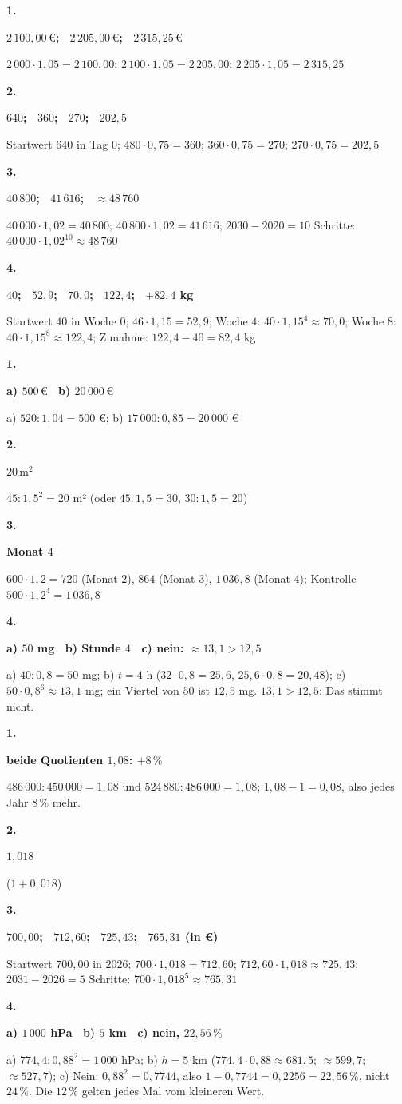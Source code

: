 \documentclass[11pt]{article}
\newcommand{\lsg}[3]{\par\noindent\begin{minipage}[t]{9mm}\textbf{#1}\end{minipage}%
  \begin{minipage}[t]{52mm}\raggedright\bfseries\boldmath #2\end{minipage}\hspace{3mm}%
  \begin{minipage}[t]{\dimexpr\linewidth-64mm\relax}\raggedright\small #3\end{minipage}\par\vspace{4pt}}
\newlength{\kr}
\begin{document}
\lsg{1.}{$2\,100{,}00\,€$; \ $2\,205{,}00\,€$; \ $2\,315{,}25\,€$}{$2\,000 \cdot 1{,}05 = 2\,100{,}00$; $2\,100 \cdot 1{,}05 = 2\,205{,}00$; $2\,205 \cdot 1{,}05 = 2\,315{,}25$}
\lsg{2.}{$640$; \ $360$; \ $270$; \ $202{,}5$}{Startwert $640$ in Tag $0$; $480 \cdot 0{,}75 = 360$; $360 \cdot 0{,}75 = 270$; $270 \cdot 0{,}75 = 202{,}5$}
\lsg{3.}{$40\,800$; \ $41\,616$; \ $\approx 48\,760$}{$40\,000 \cdot 1{,}02 = 40\,800$; $40\,800 \cdot 1{,}02 = 41\,616$; $2030 - 2020 = 10$ Schritte: $40\,000 \cdot 1{,}02^{10} \approx 48\,760$}
\lsg{4.}{$40$; \ $52{,}9$; \ $70{,}0$; \ $122{,}4$; \ $+82{,}4$ kg}{Startwert $40$ in Woche $0$; $46 \cdot 1{,}15 = 52{,}9$; Woche $4$: $40 \cdot 1{,}15^4 \approx 70{,}0$; Woche $8$: $40 \cdot 1{,}15^8 \approx 122{,}4$; Zunahme: $122{,}4 - 40 = 82{,}4$ kg}
\par\Needspace{25mm}\vspace{6pt}\noindent\colorbox{black!12}{}\hspace{2mm}{\bfseries Zurückrechnen und fehlende Zeit}\par\vspace{4pt}
\lsg{1.}{a) $500\,€$ \ b) $20\,000\,€$}{a) $520 : 1{,}04 = 500$ €; b) $17\,000 : 0{,}85 = 20\,000$ €}
\lsg{2.}{$20\,\mathrm{m}^2$}{$45 : 1{,}5^2 = 20$ m² (oder $45 : 1{,}5 = 30$, $30 : 1{,}5 = 20$)}
\lsg{3.}{Monat $4$}{$600 \cdot 1{,}2 = 720$ (Monat $2$), $864$ (Monat $3$), $1\,036{,}8$ (Monat $4$); Kontrolle $500 \cdot 1{,}2^4 = 1\,036{,}8$}
\lsg{4.}{a) $50$ mg \ b) Stunde $4$ \ c) nein: $\approx 13{,}1 > 12{,}5$}{a) $40 : 0{,}8 = 50$ mg; b) $t = 4$ h ($32 \cdot 0{,}8 = 25{,}6$, $25{,}6 \cdot 0{,}8 = 20{,}48$); c) $50 \cdot 0{,}8^6 \approx 13{,}1$ mg; ein Viertel von $50$ ist $12{,}5$ mg. $13{,}1 > 12{,}5$: Das stimmt nicht.}
\par\Needspace{25mm}\vspace{6pt}\noindent\colorbox{black!12}{}\hspace{2mm}{\bfseries Probetest}\par\vspace{4pt}
\lsg{1.}{beide Quotienten $1{,}08$: $+8\,\%$}{$486\,000 : 450\,000 = 1{,}08$ und $524\,880 : 486\,000 = 1{,}08$; $1{,}08 - 1 = 0{,}08$, also jedes Jahr $8\,\%$ mehr.}
\lsg{2.}{$1{,}018$}{($1 + 0{,}018$)}
\lsg{3.}{$700{,}00$; \ $712{,}60$; \ $725{,}43$; \ $765{,}31$ (in €)}{Startwert $700{,}00$ in $2026$; $700 \cdot 1{,}018 = 712{,}60$; $712{,}60 \cdot 1{,}018 \approx 725{,}43$; $2031 - 2026 = 5$ Schritte: $700 \cdot 1{,}018^5 \approx 765{,}31$}
\lsg{4.}{a) $1\,000$ hPa \ b) $5$ km \ c) nein, $22{,}56\,\%$}{a) $774{,}4 : 0{,}88^2 = 1\,000$ hPa; b) $h = 5$ km ($774{,}4 \cdot 0{,}88 \approx 681{,}5$; $\approx 599{,}7$; $\approx 527{,}7$); c) Nein: $0{,}88^2 = 0{,}7744$, also $1 - 0{,}7744 = 0{,}2256 = 22{,}56\,\%$, nicht $24\,\%$. Die $12\,\%$ gelten jedes Mal vom kleineren Wert.}
\end{document}
